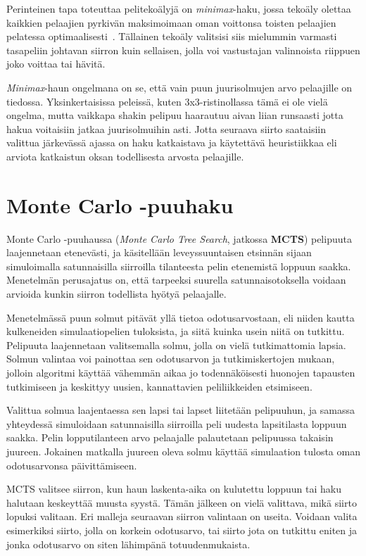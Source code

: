 \documentclass[12pt,finnish]{tktltiki2}
\theoremstyle{definition}
\theoremstyle{remark}
\begin{document}
Perinteinen tapa toteuttaa pelitekoälyjä on \textit{minimax}-haku, jossa tekoäly olettaa kaikkien pelaajien pyrkivän maksimoimaan oman voittonsa toisten pelaajien pelatessa optimaalisesti~\cite{aima}. Tällainen tekoäly valitsisi siis mielummin varmasti tasapeliin johtavan siirron kuin sellaisen, jolla voi vastustajan valinnoista riippuen joko voittaa tai hävitä.

\textit{Minimax}-haun ongelmana on se, että vain puun juurisolmujen arvo pelaajille on tiedossa. Yksinkertaisissa peleissä, kuten 3x3-ristinollassa tämä ei ole vielä ongelma, mutta vaikkapa shakin pelipuu haarautuu aivan liian runsaasti jotta hakua voitaisiin jatkaa juurisolmuihin asti. Jotta seuraava siirto saataisiin valittua järkevässä ajassa on haku katkaistava ja käytettävä heuristiikkaa eli arviota katkaistun oksan todellisesta arvosta pelaajille.~\cite{aima}


\section{Monte Carlo -puuhaku}

Monte Carlo -puuhaussa (\textit{Monte Carlo Tree Search}, jatkossa \textbf{MCTS}) pelipuuta laajennetaan etenevästi, ja käsitellään leveyssuuntaisen etsinnän sijaan simuloimalla satunnaisilla siirroilla tilanteesta pelin etenemistä loppuun saakka. Menetelmän perusajatus on, että tarpeeksi suurella satunnaisotoksella voidaan arvioida kunkin siirron todellista hyötyä pelaajalle.~\cite{browne}

Menetelmässä puun solmut pitävät yllä tietoa odotusarvostaan, eli niiden kautta kulkeneiden simulaatiopelien tuloksista, ja siitä kuinka usein niitä on tutkittu. Pelipuuta laajennetaan valitsemalla solmu, jolla on vielä tutkimattomia lapsia. Solmun valintaa voi painottaa sen odotusarvon ja tutkimiskertojen mukaan, jolloin algoritmi käyttää vähemmän aikaa jo todennäköisesti huonojen tapausten tutkimiseen ja keskittyy uusien, kannattavien peliliikkeiden etsimiseen.~\cite{browne}

Valittua solmua laajentaessa sen lapsi tai lapset liitetään pelipuuhun, ja samassa yhteydessä simuloidaan satunnaisilla siirroilla peli uudesta lapsitilasta loppuun saakka. Pelin lopputilanteen arvo pelaajalle palautetaan pelipuussa takaisin juureen. Jokainen matkalla juureen oleva solmu käyttää simulaation tulosta oman odotusarvonsa päivittämiseen. ~\cite{browne}

MCTS valitsee siirron, kun haun laskenta-aika on kulutettu loppuun tai haku halutaan keskeyttää muusta syystä. Tämän jälkeen on vielä valittava, mikä siirto lopuksi valitaan. Eri malleja seuraavan siirron valintaan on useita. Voidaan valita esimerkiksi siirto, jolla on korkein odotusarvo, tai siirto jota on tutkittu eniten ja jonka odotusarvo on siten lähimpänä totuudenmukaista.~\cite{browne}
\end{document}

